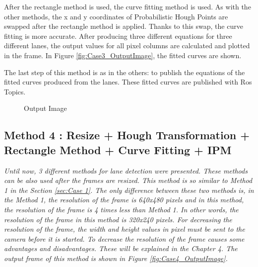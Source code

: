 After the rectangle method is used, the curve fitting method is used. As with the other methods, the x and y coordinates of Probabilistic Hough Points are swapped after the rectangle method is applied. Thanks to this swap, the curve fitting is more accurate. After producing three different equations for three different lanes, the output values for all pixel columns are calculated and plotted in the frame. In Figure \ref{fig:Case3_OutputImage}, the fitted curves are shown.

The last step of this method is as in the others: to publish the equations of the fitted curves produced from the lanes. These fitted curves are published with Ros Topics.

\begin{figure}[H]
  \centering
  \caption{Output Image}
\end{figure}





\subsection{Method 4 : Resize + Hough Transformation + Rectangle Method + Curve Fitting + IPM}\label{sec:Case 4}


\emph{\color{blue}Until now, 3 different methods for lane detection were presented. These methods can be also used after the frames are resized. This method is so similar to Method 1 in the Section \ref{sec:Case 1}. The only difference between these two methods is, in the Method 1, the resolution of the frame is 640x480 pixels and in this method, the resolution of the frame is 4 times less than Method 1. In other words, the resolution of the frame in this method is 320x240 pixels. For decreasing the resolution of the frame, the width and height values in pixel must be sent to the camera before it is started. To decrease the resolution of the frame causes some advantages and disadvantages. These will be explained in the Chapter 4. The output frame of this method is shown in Figure \ref{fig:Case4_OutputImage}.}


